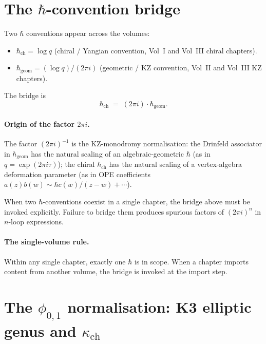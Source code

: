 \section{The \texorpdfstring{$\hbar$}{hbar}-convention bridge}
\label{sec:hbar-bridge}

Two $\hbar$ conventions appear across the volumes:
\begin{itemize}
 \item $\hbar_{\mathrm{ch}} = \log q$ (chiral / Yangian convention,
 Vol~I and Vol~III chiral chapters).
 \item $\hbar_{\mathrm{geom}} = (\log q)/(2 \pi i)$ (geometric / KZ
 convention, Vol~II and Vol~III KZ chapters).
\end{itemize}

The bridge is
\[
 \boxed{\;\hbar_{\mathrm{ch}} \;=\; (2 \pi i) \cdot \hbar_{\mathrm{geom}}.\;}
\]

\paragraph{Origin of the factor \texorpdfstring{$2 \pi i$}{2 pi i}.}
The factor $(2 \pi i)^{-1}$ is the KZ-monodromy normalisation: the
Drinfeld associator in $\hbar_{\mathrm{geom}}$ has the natural scaling of an
algebraic-geometric $\hbar$ \textup{(}as in
$q = \exp(2 \pi i \tau)$\textup{);} the chiral $\hbar_{\mathrm{ch}}$ has the
natural scaling of a vertex-algebra deformation parameter
\textup{(}as in OPE coefficients $a(z) b(w) \sim \hbar c(w)/(z - w) +
\cdots$\textup{).}

When two $\hbar$-conventions coexist in a single chapter, the bridge above
must be invoked explicitly. Failure to bridge them produces spurious
factors of $(2 \pi i)^n$ in $n$-loop expressions.

\paragraph{The single-volume rule.}
Within any single chapter, exactly one $\hbar$ is in scope. When a chapter
imports content from another volume, the bridge is invoked at the import
step.


\section{The \texorpdfstring{$\phi_{0,1}$}{phi-0,1} normalisation: K3 elliptic genus and
 \texorpdfstring{$\kappa_{\mathrm{ch}}$}{kappa-ch}}
\label{sec:phi01-normalisation}

